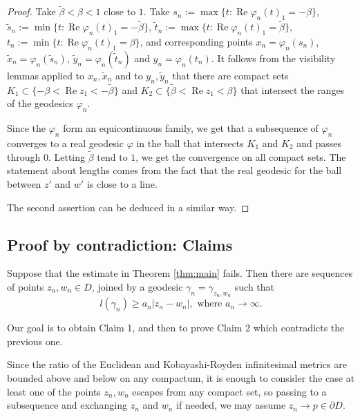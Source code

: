 \documentclass[a4paper,12pt]{amsart}
\def\re{\operatorname{Re}}
\theoremstyle{remark}\newtheorem{remark}[theorem]{Remark}
\begin{document}
\begin{proof}
Take $\tilde \beta< \beta<1$ close to $1$. 
Take $s_n:=\max\{ t: \re \varphi_n(t)_1= - \beta\} $,
$\tilde s_n:=\min\{ t: \re \varphi_n(t)_1= -\tilde \beta\} $,
$\tilde t_n:=\max\{ t: \re \varphi_n(t)_1= \tilde \beta\} $,
$t_n:=\min\{ t: \re \varphi_n(t)_1=  \beta\} $,
and corresponding points 
$x_n=\varphi_n(s_n)$, $\tilde x_n=\varphi_n(\tilde s_n)$, 
$\tilde y_n=\varphi_n(\tilde t_n)$ and $y_n=\varphi_n(t_n)$. It follows from the visibility lemmas applied to $x_n, \tilde x_n$ and to $y_n, \tilde y_n$ that there are compact sets $K_1\subset \{-\beta< \re z_1 < - \tilde \beta\}$ and $K_2 \subset \{\tilde \beta < \re z_1 < \beta\}$ that intersect the ranges of the geodesics $\varphi_n$.

Since the $\varphi_n$ form an equicontinuous family, we get that a subsequence of $\varphi_n$ converges to a real geodesic
$\varphi$ in the ball that intersects $K_1$ and $K_2$
and passes through $0$. 
Letting $\tilde\beta$ tend to $1$, we get the  convergence on all
compact sets. The statement about lengths comes from the fact that the 
real geodesic for the ball between $z'$ and $w'$ is close to a line.

The second assertion can be deduced in a similar way.
\end{proof}



\subsection{Proof by contradiction: Claims}

Suppose that the estimate in Theorem \ref{thm:main} fails. 
Then there are sequences of points $z_n,w_n\in D$,
joined by a geodesic $\gamma_n = \gamma_{z_n, w_n}$ 
such that 
\begin{equation}
\label{toolong}
l(\gamma_n) \geq a_n |z_n - w_n|, \mbox{ where }a_n\to \infty.
\end{equation}

Our goal is to obtain Claim 1, and then to prove Claim 2 which
contradicts the previous one.
 
Since the ratio of the Euclidean and Kobayashi-Royden infinitesimal metrics are bounded
above and below on any compactum, it is enough to consider the case at least one of the points $z_n,w_n$
escapes from any compact set, so passing to a subsequence
and exchanging $z_n$ and $w_n$ if needed, we may
assume $z_n\to p\in \partial D$. 
\end{document}
